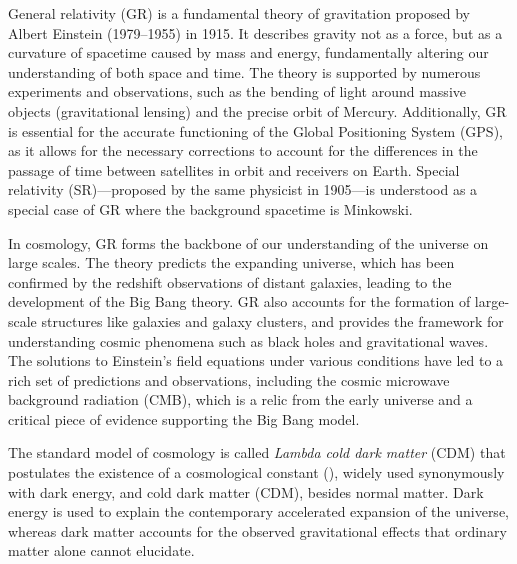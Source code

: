 






General relativity (GR) is a fundamental theory of gravitation proposed by Albert Einstein (1979--1955) in 1915. It describes gravity not as a force, but as a curvature of spacetime caused by mass and energy, fundamentally altering our understanding of both space and time. The theory is supported by numerous experiments and observations, such as the bending of light around massive objects (gravitational lensing) and the precise orbit of Mercury. Additionally, GR is essential for the accurate functioning of the Global Positioning System (GPS), as it allows for the necessary corrections to account for the differences in the passage of time between satellites in orbit and receivers on Earth.
%
Special relativity (SR)---proposed by the same physicist in 1905---is understood as a special case of GR where the background spacetime is Minkowski. 
%


In cosmology, GR forms the backbone of our understanding of the universe on large scales. The theory predicts the expanding universe, which has been confirmed by the redshift observations of distant galaxies, leading to the development of the Big Bang theory. GR also accounts for the formation of large-scale structures like galaxies and galaxy clusters, and provides the framework for understanding cosmic phenomena such as black holes and gravitational waves. The solutions to Einstein's field equations under various conditions have led to a rich set of predictions and observations, including the cosmic microwave background radiation (CMB), which is a relic from the early universe and a critical piece of evidence supporting the Big Bang model.



The standard model of cosmology is called \textit{Lambda cold dark matter} (\textLambda{}CDM) that postulates the existence of a cosmological constant (\textLambda{}), widely used synonymously with dark energy, and cold dark matter (CDM), besides normal matter. Dark energy is used to explain the contemporary accelerated expansion of the universe, whereas dark matter accounts for the observed gravitational effects that ordinary matter alone cannot elucidate. %


